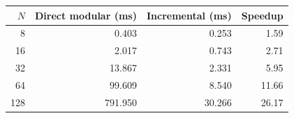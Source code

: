 \begin{center}
\begin{tabular}{@{}rrrr@{}}
\toprule
$N$ & Direct modular (ms) & Incremental (ms) & Speedup\\
\midrule
8 & 0.403 & 0.253 & 1.59\\
16 & 2.017 & 0.743 & 2.71\\
32 & 13.867 & 2.331 & 5.95\\
64 & 99.609 & 8.540 & 11.66\\
128 & 791.950 & 30.266 & 26.17\\
\bottomrule
\end{tabular}
\end{center}
